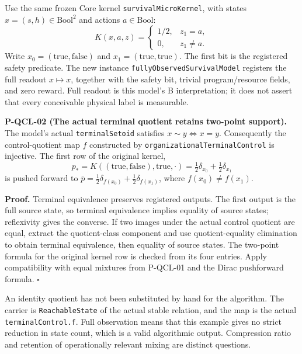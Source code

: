 \documentclass[
  11pt,
  oneside]{book}
\begin{document}
Use the same frozen Core kernel \texttt{survival\allowbreak Micro\allowbreak Kernel}, with
states \(x=(s,h)\in\mathrm{Bool}^2\) and actions \(a\in\mathrm{Bool}\):
\[
K(x,a,z)=\begin{cases}1/2,&z_1=a,\\0,&z_1\ne a.\end{cases}
\] Write \(x_0=(\mathrm{true},\mathrm{false})\) and
\(x_1=(\mathrm{true},\mathrm{true})\). The first bit is the registered
safety predicate. The new instance \texttt{fully\allowbreak Observed\allowbreak Survival\allowbreak Model}
registers the full readout \(x\mapsto x\), together with the safety bit,
trivial program/resource fields, and zero reward. Full readout is this
model's B interpretation; it does not assert that every conceivable
physical label is measurable.

\label{p-qcl-02}{}

\textbf{P-QCL-02 (The actual terminal quotient retains two-point
support).} The model's actual \texttt{terminal\allowbreak Setoid} satisfies
\(x\sim y\iff x=y\). Consequently the control-quotient map \(f\)
constructed by \texttt{organizational\allowbreak Terminal\allowbreak Control} is injective. The
first row of the original kernel, \[
p_* = K((\mathrm{true},\mathrm{false}),\mathrm{true},\cdot)
=\tfrac12\delta_{x_0}+\tfrac12\delta_{x_1}
\] is pushed forward to
\(\bar p=\tfrac12\delta_{f(x_0)}+\tfrac12\delta_{f(x_1)}\), where
\(f(x_0)\ne f(x_1)\).

\textbf{Proof.} Terminal equivalence preserves registered outputs. The
first output is the full source state, so terminal equivalence implies
equality of source states; reflexivity gives the converse. If two images
under the actual control quotient are equal, extract the quotient-class
component and use quotient-equality elimination to obtain terminal
equivalence, then equality of source states. The two-point formula for
the original kernel row is checked from its four entries. Apply
compatibility with equal mixtures from P-QCL-01 and the Dirac
pushforward formula. \(\square\)

An identity quotient has not been substituted by hand for the algorithm.
The carrier is \texttt{Reachable\allowbreak State} of the actual stable relation,
and the map is the actual \texttt{terminal\allowbreak Control.\allowbreak f}. Full observation
means that this example gives no strict reduction in state count, which
is a valid algorithmic output. Compression ratio and retention of
operationally relevant mixing are distinct questions.
\end{document}
